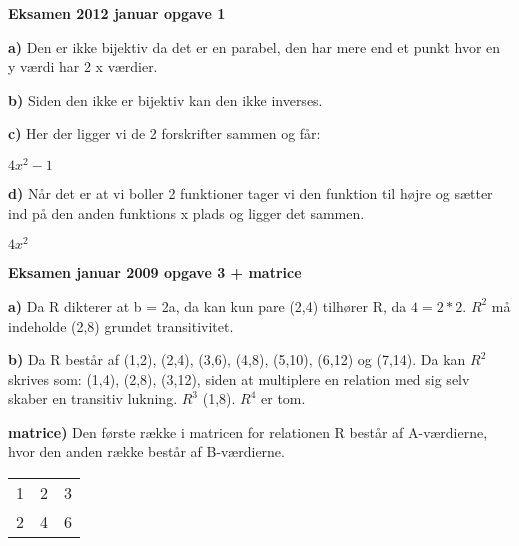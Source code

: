 \documentclass{article}
\begin{document}
\textbf{Eksamen 2012 januar opgave 1}

\textbf{a)}
Den er ikke bijektiv da det er en parabel, den har mere end et punkt
hvor en y værdi har 2 x værdier. 

\vspace{5mm} %

\textbf{b)}
Siden den ikke er bijektiv kan den ikke inverses.

\vspace{5mm} %

\textbf{c)}
Her der ligger vi de 2 forskrifter sammen og får:

$4x^2-1$

\vspace{5mm} %

\textbf{d)}
Når det er at vi boller 2 funktioner tager vi den funktion til højre og sætter ind på den anden funktions x plads og ligger det sammen.

$4x^2$

\vspace{5mm} %

\textbf{Eksamen januar 2009 opgave 3 + matrice}

\textbf{a)}
Da R dikterer at b = 2a,  da kan kun pare (2,4) tilhører R, da $4 = 2*2$. $R^2$ må indeholde (2,8) grundet transitivitet.

\vspace{5mm} %

\textbf{b)}
Da R består af (1,2), (2,4), (3,6), (4,8), (5,10), (6,12) og (7,14). Da kan $R^2$ skrives som: (1,4), (2,8), (3,12), siden at multiplere en relation med sig selv skaber en transitiv lukning. $R^3$ (1,8). $R^4$ er tom.

\vspace{5mm} %

\textbf{matrice)}
Den første række i matricen for relationen R består af A-værdierne, hvor den anden række består af B-værdierne.
\begin{tabular}{ | c | c | c | }
 \hline
 1 & 2 & 3 \\
 2 & 4 & 6 \\
 \hline
\end{tabular}
\end{document}
